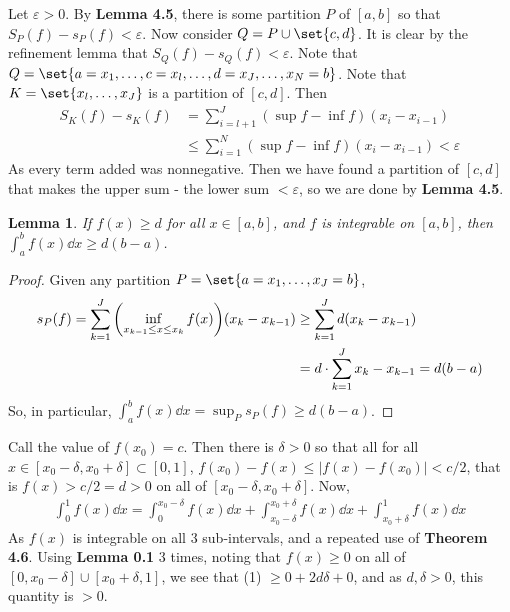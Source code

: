 \documentclass[12pt]{article}
\newtheorem{lemma}[theorem]{Lemma}
\theoremstyle{definition}
\theoremstyle{remark}
\newcommand{\ve}{\varepsilon}
\begin{document}
\begin{enumerate}[leftmargin=\labelsep]
		Let $\ve > 0$. By \textbf{Lemma 4.5}, there is some partition $P$ of $[a, b]$ so that $S_P(f) - s_P(f) < \ve$. Now consider $Q = P \cup \set{c, d}$. It is clear by the refinement lemma that $S_Q(f) - s_Q(f) < \ve$. Note that $Q = \set{a=x_1, \ldots, c=x_l, \ldots, d=x_{J}, \ldots, x_N = b}$. Note that $K = \set{x_l, \ldots, x_J}$ is a partition of $[c, d]$. Then
		\begin{align*}
			S_K(f) - s_K(f) &= \sum_{i=l+1}^{J} (\sup f - \inf f)(x_{i}-x_{i-1}) 
			\\ &\leq \sum_{i=1}^{N} (\sup f - \inf f)(x_{i}-x_{i-1}) < \ve
		\end{align*}
		As every term added was nonnegative. Then we have found a partition of $[c, d]$ that makes the upper sum - the lower sum $< \ve$, so we are done by \textbf{Lemma 4.5}.
		
		\begin{lemma}
			If $f(x) \geq d$ for all $x \in [a, b]$, and $f$ is integrable on $[a, b]$, then $\int_a^b f(x) \dd x \geq d(b-a)$.
		\end{lemma}
		\begin{proof}
			Given any partition $P=\set{a=x_1, \ldots, x_J=b}$, 
			\begin{align*}
				s_P(f) = \sum_{k=1}^{J} \qty(\inf_{x_{k-1} \leq x \leq x_k} f(x))(x_k-x_{k-1}) &\geq \sum_{k=1}^{J} d(x_k-x_{k-1}) \\
				&= d \cdot \sum_{k=1}^{J} x_k-x_{k-1} = d(b-a)
			\end{align*}
		So, in particular, $\int_a^b f(x) \dd x = \sup_{P} s_P(f) \geq d(b-a)$.
		\end{proof}
		Call the value of $f(x_0) = c$. Then there is $\delta > 0$ so that all for all $x \in [x_0-\delta, x_0+\delta] \subset [0, 1]$, $f(x_0) - f(x) \leq |f(x)-f(x_0)| < c/2$, that is $f(x) > c/2 = d > 0$ on all of $[x_0-\delta, x_0+\delta]$.
		Now, \begin{align}
			\int_0^1 f(x) \dd x = \int_0^{x_0-\delta} f(x) \dd x + \int_{x_0-\delta}^{x_0+\delta} f(x) \dd x + \int_{x_0+\delta}^{1} f(x) \dd x
		\end{align}
		As $f(x)$ is integrable on all 3 sub-intervals, and a repeated use of \textbf{Theorem 4.6}. Using \textbf{Lemma 0.1} 3 times, noting that $f(x) \geq 0$ on all of $[0, x_0-\delta] \cup [x_0+\delta, 1]$, we see that (1) $\geq 0 + 2d\delta + 0$, and as $d, \delta > 0$, this quantity is $> 0$.
		

\end{enumerate}
\end{document}

